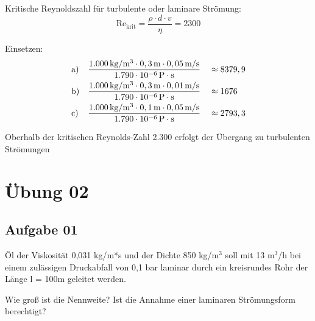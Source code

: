 \documentclass[a4paper,11pt]{article}
\begin{document}
\ppbig

 

Kritische Reynoldszahl für turbulente oder laminare Strömung:
\begin{equation}
\text{Re}_{\text{krit}} = \frac{\rho \cdot d \cdot v}{\eta} = 2300
\end{equation}
\reversemarginpar

Einsetzen:
\begin{align*}
&\text{a)} && \frac{1.000\mskip3mu \text{kg}/\text{m}^3 \cdot 0,3\mskip3mu \text{m} \cdot 0,05\mskip3mu \text{m}/\text{s}}{1.790 \cdot 10^{-6}\mskip3mu \text{P} \cdot \text{s}} &&\approx 8379,9 \\
&\text{b)} && \frac{1.000\mskip3mu \text{kg}/\text{m}^3 \cdot 0,3\mskip3mu \text{m} \cdot 0,01\mskip3mu \text{m}/\text{s}}{1.790 \cdot 10^{-6}\mskip3mu \text{P} \cdot \text{s}} &&\approx 1676 \\
&\text{c)} && \frac{1.000\mskip3mu \text{kg}/\text{m}^3 \cdot 0,1\mskip3mu \text{m} \cdot 0,05\mskip3mu \text{m}/\text{s}}{1.790 \cdot 10^{-6}\mskip3mu \text{P} \cdot \text{s}} &&\approx 2793,3 \\
\end{align*}

Oberhalb der kritischen Reynolds-Zahl 2.300 erfolgt der Übergang zu turbulenten Strömungen


\pagebreak





\section*{Übung 02}
\subsection*{Aufgabe 01}
Öl der Viskosität 0,031 kg/m*s und der Dichte 850 kg/m$^3$ soll mit 13 m$^3$/h bei einem
zulässigen Druckabfall von 0,1 bar laminar durch ein kreisrundes Rohr der Länge
l = 100m geleitet werden. \par 
Wie groß ist die Nennweite? Ist die Annahme einer laminaren Strömungsform
berechtigt?
\end{document}
